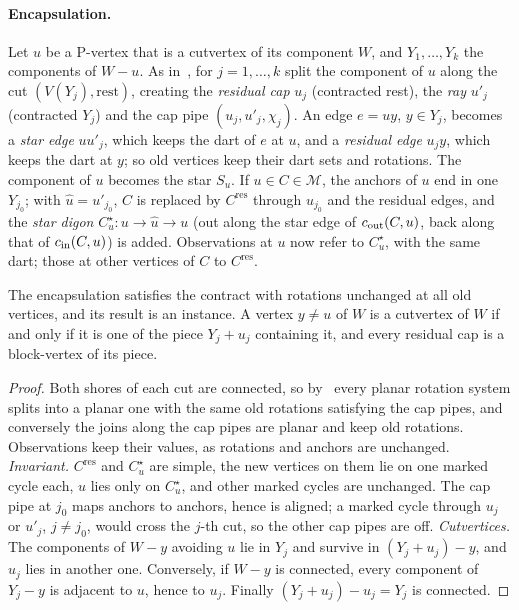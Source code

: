 \paragraph{Encapsulation.} Let $u$ be a P-vertex that is a cutvertex of its
component $W$, and $Y_1,\dots,Y_k$ the components of $W-u$.
As in~\cite[Section~3.2]{BFR21}, for $j=1,\dots,k$ split the component of
$u$ along the cut $(V(Y_j),\text{rest})$, creating the \emph{residual cap}
$u_j$ (contracted rest), the \emph{ray} $u'_j$ (contracted $Y_j$) and the cap
pipe $(u_j,u'_j,\chi_j)$. An edge $e=uy$, $y\in Y_j$, becomes a \emph{star
edge} $uu'_j$, which keeps the dart of $e$ at $u$, and a \emph{residual edge}
$u_jy$, which keeps the dart at $y$; so old vertices keep their dart sets and
rotations. The component of $u$ becomes the star $S_u$. If $u\in
C\in\mathcal M$, the anchors of $u$ end in one $Y_{j_0}$; with $\hat
u=u'_{j_0}$, $C$ is replaced by $C^{\mathrm{res}}$ through $u_{j_0}$ and
the residual edges, and the \emph{star digon} $C^\star_u:u\to\hat u\to u$
(out along the star edge of $c_{\mathrm{out}}(C,u)$, back along that of $c_{\mathrm{in}}(C,u)$)
is added. Observations at $u$ now refer to $C^\star_u$, with the same dart;
those at other vertices of $C$ to $C^{\mathrm{res}}$.

\begin{lemma}[encapsulation]\label{lem:eng4-encap}
The encapsulation satisfies the contract with rotations unchanged at all old
vertices, and its result is an instance. A vertex $y\ne u$ of $W$ is a
cutvertex of $W$ if and only if it is one of the piece $Y_j+u_j$
containing it, and every residual cap is a block-vertex of its piece.
\end{lemma}

\begin{proof}
Both shores of each cut are connected, so by~\cite[Lemma~1, Section~2]{BFR21}
every planar rotation system splits into a planar one with the same old
rotations satisfying the cap pipes, and conversely the joins along the cap
pipes are planar and keep old rotations. Observations keep their values,
as rotations and anchors are unchanged.
\emph{Invariant.} $C^{\mathrm{res}}$ and $C^\star_u$ are simple, the new
vertices on them lie on one marked cycle each, $u$ lies only on
$C^\star_u$, and other marked cycles are unchanged. The cap pipe at $j_0$
maps anchors to anchors, hence is aligned; a marked cycle through $u_j$ or
$u'_j$, $j\ne j_0$, would cross the $j$-th cut, so the other cap pipes are
off. \emph{Cutvertices.} The components of $W-y$ avoiding $u$ lie in $Y_j$
and survive in $(Y_j+u_j)-y$, and $u_j$ lies in another one. Conversely, if
$W-y$ is connected, every component of $Y_j-y$ is adjacent to $u$, hence to
$u_j$. Finally $(Y_j+u_j)-u_j=Y_j$ is connected.
\end{proof}

